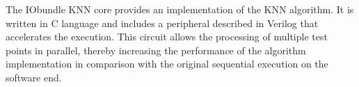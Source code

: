 The IObundle KNN core provides an implementation of the KNN algorithm. 
It is written in C language and includes a peripheral described in Verilog that accelerates the execution.
This circuit allows the processing of multiple test points in parallel, thereby increasing the performance
of the algorithm implementation in comparison with the original sequential execution on the software end.



